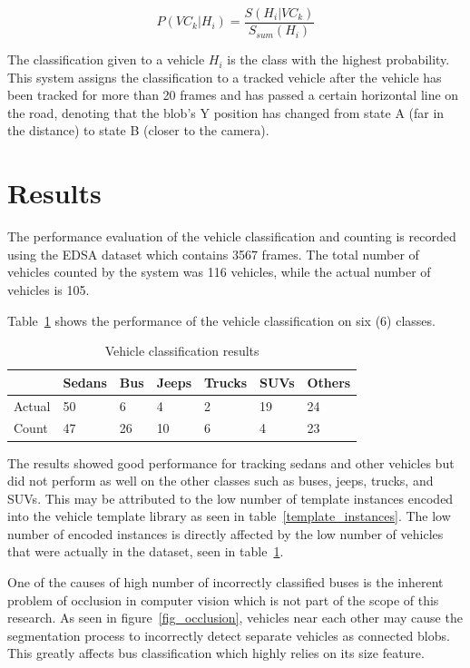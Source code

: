 \documentclass[conference]{IEEEtran}
\begin{document}
$$
P(VC_k | H_i) = \frac{S(H_i | VC_k)}{S_{sum} (H_i)}
$$


The classification given to a vehicle $H_i$ is the class with the highest probability. This system assigns the classification to a tracked vehicle after the vehicle has been tracked for more than 20 frames and has passed a certain horizontal line on the road, denoting that the blob's Y position has changed from state A (far in the distance) to state B (closer to the camera).

\section{Results}

The performance evaluation of the vehicle classification and counting is recorded using the EDSA dataset which contains 3567 frames. The total number of vehicles counted by the system was 116 vehicles, while the actual number of vehicles is 105.

Table~\ref{classification_results} shows the performance of the vehicle classification on six (6) classes. 

\begin{table}[ht!]
\centering
\caption{Vehicle classification results}
\label{classification_results}
\begin{tabular}{|l|l|l|l|l|l|l|}
\hline
       & Sedans & Bus & Jeeps & Trucks & SUVs & Others \\ \hline
Actual & 50     & 6   & 4     & 2      & 19   & 24     \\ \hline
Count  & 47     & 26  & 10    & 6      & 4    & 23     \\ \hline
\end{tabular}
\end{table}

The results showed good performance for tracking sedans and other vehicles but did not perform as well on the other classes such as buses, jeeps, trucks, and SUVs. This may be attributed to the low number of template instances encoded into the vehicle template library as seen in table~\ref{template_instances}. The low number of encoded instances is directly affected by the low number of vehicles that were actually in the dataset, seen in table~\ref{classification_results}.


One of the causes of high number of incorrectly classified buses is the inherent problem of occlusion in computer vision which is not part of the scope of this research. As seen in figure~\ref{fig_occlusion}, vehicles near each other may cause the segmentation process to incorrectly detect separate vehicles as connected blobs. This greatly affects bus classification which highly relies on its size feature.
\end{document}
